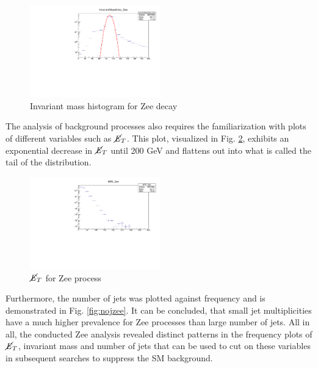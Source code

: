 \documentclass[runningheads,a4paper]{llncs}
\begin{document}
\begin{figure}
\centering
\includegraphics[height=4cm]{InvM_Zee_fit}
\caption{Invariant mass histogram for Zee decay}
\label{fig:invmzee}
\end{figure}

The analysis of background processes also requires the familiarization with plots of different variables such as $\cancel{\it{E}}_{T}$. This plot, visualized in Fig. \ref{fig:mtezee}, exhibits an exponential decrease in $\cancel{\it{E}}_{T}$ until 200 GeV and flattens out into what is called the tail of the distribution.\\

\begin{figure}
\centering
\includegraphics[height=4cm]{MTE_Zee+new}
\caption{$\cancel{\it{E}}_{T}$ for Zee process}
\label{fig:mtezee}
\end{figure}

Furthermore, the number of jets was plotted against frequency and is demonstrated in Fig. \ref{fig:nojzee}. It can be concluded, that small jet multiplicities have a much higher prevalence for Zee processes than large number of jets. All in all, the conducted Zee analysis revealed distinct patterns in the frequency plots of $\cancel{\it{E}}_{T}$, invariant mass and number of jets that can be used to cut on these variables in subsequent searches to suppress the SM background.\\
\end{document}
